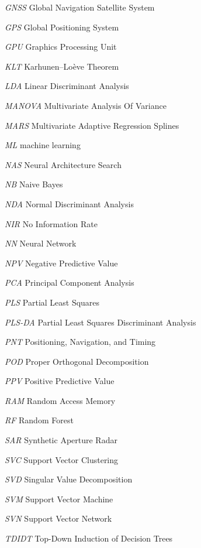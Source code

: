 \documentclass[sn-mathphys-num]{sn-jnl}%
\begin{document}
\textit{GNSS} Global Navigation Satellite System

\textit{GPS} Global Positioning System

\textit{GPU} Graphics Processing Unit



\textit{KLT} Karhunen–Loève Theorem



\textit{LDA} Linear Discriminant Analysis



\textit{MANOVA} Multivariate Analysis Of Variance

\textit{MARS} Multivariate Adaptive Regression Splines

\textit{ML} machine learning



\textit{NAS} Neural Architecture Search

\textit{NB} Naive Bayes

\textit{NDA} Normal Discriminant Analysis

\textit{NIR} No Information Rate

\textit{NN} Neural Network

\textit{NPV} Negative Predictive Value



\textit{PCA} Principal Component Analysis

\textit{PLS} Partial Least Squares

\textit{PLS-DA} Partial Least Squares Discriminant Analysis

\textit{PNT} Positioning, Navigation, and Timing

\textit{POD} Proper Orthogonal Decomposition

\textit{PPV} Positive Predictive Value



\textit{RAM} Random Access Memory

\textit{RF} Random Forest



\textit{SAR} Synthetic Aperture Radar

\textit{SVC} Support Vector Clustering

\textit{SVD} Singular Value Decomposition

\textit{SVM} Support Vector Machine

\textit{SVN} Support Vector Network



\textit{TDIDT} Top-Down Induction of Decision Trees
\end{document}
